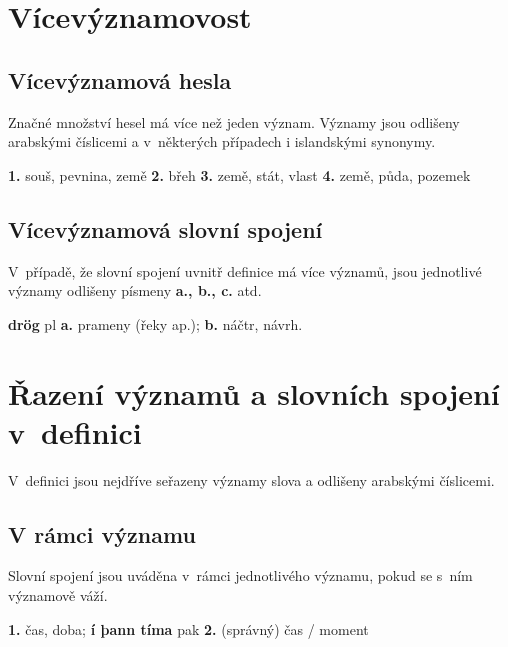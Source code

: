 \section{Vícevýznamovost}

\subsection*{Vícevýznamová hesla}

Značné množství hesel má více než jeden význam. Významy jsou odlišeny arabskými číslicemi a v~některých případech i islandskými synonymy.

\blspace
  \dicEntry {}   {\textbf{1.}}  {souš, pevnina, země} {\textbf{2.}}  {břeh} {\textbf{3.}}  {země, stát, vlast} {\textbf{4.}}  {země, půda, pozemek}
\blspace

\subsection*{Vícevýznamová slovní spojení}

V~případě, že slovní spojení uvnitř definice má více významů, jsou jednotlivé významy odlišeny písmeny {\textbf{a., b., c.}} atd.

\blspace
  \dicEntry {} {  \textbf{drög} {\footnotesize{pl}} {\textbf{a.}}  {prameny (řeky ap.);} {\textbf{b.}} {náčtr, návrh.}}
\blspace

\section{Řazení významů a slovních spojení v~definici}
\longsectionskip

V~definici jsou nejdříve seřazeny významy slova a odlišeny arabskými číslicemi.

\subsection*{V rámci významu}

Slovní spojení jsou uváděna v~rámci jednotlivého významu, pokud se s~ním významově váží.

\blspace
  \dicEntry {}   {\textbf{1.}}  {čas, doba}; \textbf{í þann tíma}   {pak} {\textbf{2.}}  {(správný) čas / moment}
\blspace

